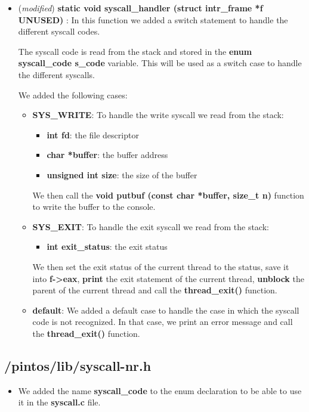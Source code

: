 \documentclass[11pt]{scrartcl}
\begin{document}
\begin{itemize}
    \item (\textit{modified}) \textbf{static void syscall\_handler (struct intr\_frame *f UNUSED) }:
          In this function we added a switch statement to handle the different syscall codes.

          The syscall code is read from the stack and stored in the \textbf{enum syscall\_code s\_code} variable.
          This will be used as a switch case to handle the different syscalls.

          We added the following cases:
          \begin{itemize}
              \item \textbf{SYS\_WRITE}:
                    To handle the write syscall we read from the stack:
                    \begin{itemize}
                        \item \textbf{int fd}: the file descriptor
                        \item \textbf{char *buffer}: the buffer address
                        \item \textbf{unsigned int size}: the size of the buffer
                    \end{itemize}
                    We then  call the \textbf{void putbuf (const char *buffer, size\_t n) } function to write the buffer to the console.
              \item \textbf{SYS\_EXIT}:
                    To handle the exit syscall we read from the stack:
                    \begin{itemize}
                        \item \textbf{int exit\_status}: the exit status
                    \end{itemize}
                    We then set the exit status of the current thread to the status,
                    save it into \textbf{f->eax},
                    \textbf{print} the exit statement of the current thread,
                    \textbf{unblock} the parent of the current thread and call the \textbf{thread\_exit()} function.
              \item \textbf{default}:
                    We added a default case to handle the case in which the syscall code is not recognized.
                    In that case, we print an error message and call the \textbf{thread\_exit()} function.
          \end{itemize}
\end{itemize}

\subsection*{/pintos/lib/syscall-nr.h}

\begin{itemize}
    \item We added the name \textbf{syscall\_code} to the enum declaration to be able to use it in the \textbf{syscall.c} file.
\end{itemize}
\end{document}
